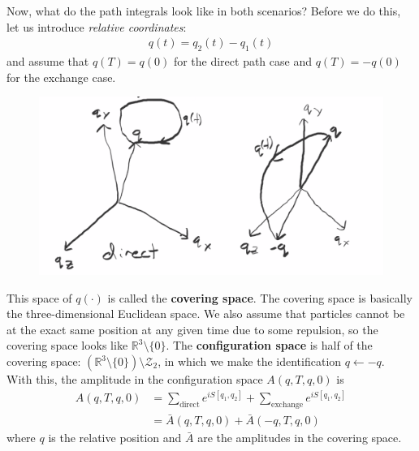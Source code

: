 \documentclass{book}
\theoremstyle{definition}
\newcommand{\R}{\mathbb{R}}
\newcommand{\nn}{\nonumber}
\newcommand{\Z}{\mathcal{Z}}
\begin{document}
Now, what do the path integrals look like in both scenarios? Before we do this, let us introduce \textit{relative coordinates}:
\begin{align}
q(t) = q_2(t) - q_1(t)
\end{align}
and assume that $q(T) = q(0)$ for the direct path case and $q(T) = -q(0)$ for the exchange case. 
\begin{figure}[!htb]
	\centering
	\includegraphics[scale=0.2]{paths1}
\end{figure}
This space of $q(\cdot)$ is called the \textbf{covering space}. The covering space is basically the three-dimensional Euclidean space. We also assume that particles cannot be at the exact same position at any given time due to some repulsion, so the covering space looks like $\R^3\setminus\{ 0\}$. The \textbf{configuration space} is half of the covering space: $(\R^3\setminus\{ 0\})\setminus \Z_2$, in which we make the identification $q \leftarrow -q$. \\

With this, the amplitude in the configuration space $A(q,T,q,0)$ is 
\begin{align}
A(q,T,q,0) &= \sum_{\text{direct}} e^{iS[q_1,q_2]} + \sum_{\text{exchange}} e^{iS[q_1,q_2]} \nn\\
&= \bar{A}(q,T,q,0) + \bar{A}(-q,T,q,0)
\end{align} 
where $q$ is the relative position and $\bar{A}$ are the amplitudes in the covering space. \\
\end{document}
